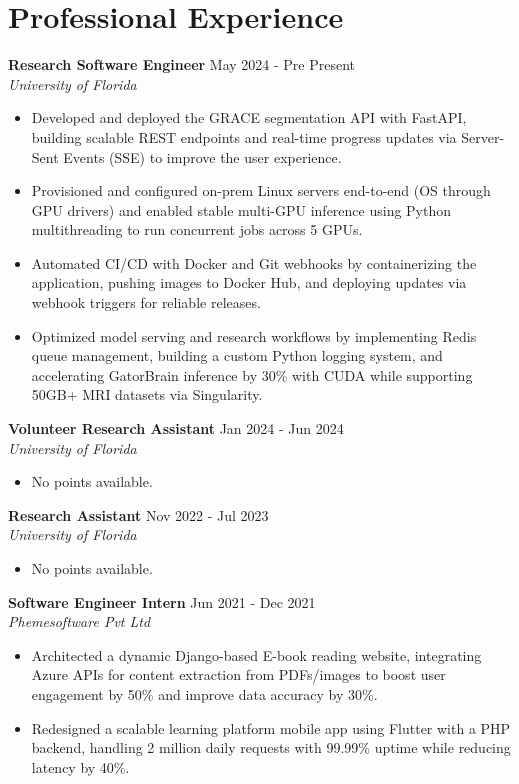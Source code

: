 \documentclass[a4paper,10pt]{article}
\begin{document}
\section*{Professional Experience}
\vspace{-3pt}
\textbf{Research Software Engineer} \hfill May 2024 - Pre Present \\
\textit{University of Florida}
\begin{itemize}
\item Developed and deployed the GRACE segmentation API with FastAPI, building scalable REST endpoints and real-time progress updates via Server-Sent Events (SSE) to improve the user experience.
\item Provisioned and configured on-prem Linux servers end-to-end (OS through GPU drivers) and enabled stable multi-GPU inference using Python multithreading to run concurrent jobs across 5 GPUs.
\item Automated CI/CD with Docker and Git webhooks by containerizing the application, pushing images to Docker Hub, and deploying updates via webhook triggers for reliable releases.
\item Optimized model serving and research workflows by implementing Redis queue management, building a custom Python logging system, and accelerating GatorBrain inference by 30\% with CUDA while supporting 50GB+ MRI datasets via Singularity.
\end{itemize}
\vspace{-6pt}
\textbf{Volunteer Research Assistant} \hfill Jan 2024 - Jun 2024 \\
\textit{University of Florida}
\begin{itemize}
\item No points available.
\end{itemize}
\vspace{-6pt}
\textbf{Research Assistant} \hfill Nov 2022 - Jul 2023 \\
\textit{University of Florida}
\begin{itemize}
\item No points available.
\end{itemize}
\vspace{-6pt}
\textbf{Software Engineer Intern} \hfill Jun 2021 - Dec 2021 \\
\textit{Phemesoftware Pvt Ltd}
\begin{itemize}
\item Architected a dynamic Django-based E-book reading website, integrating Azure APIs for content extraction from PDFs/images to boost user engagement by 50\% and improve data accuracy by 30\%.
\item Redesigned a scalable learning platform mobile app using Flutter with a PHP backend, handling 2 million daily requests with 99.99\% uptime while reducing latency by 40\%.
\end{itemize}
\end{document}
